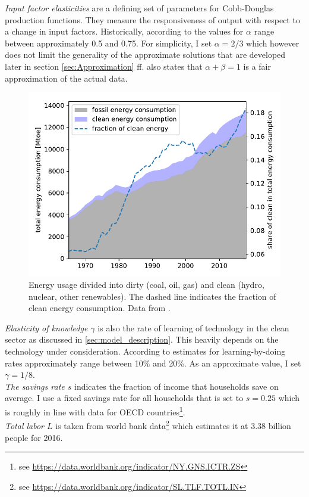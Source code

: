 \textit{Input factor elasticities} are a defining set of parameters for Cobb-Douglas production functions. They measure the responsiveness of output with respect to a change in input factors. Historically, according to \cite{Douglas1976} the values for $\alpha$ range between approximately 0.5 and 0.75. For simplicity, I set $\alpha=2/3$ which however does not limit the generality of the approximate solutions that are developed later in section \ref{sec:Approximation} ff. \cite{Douglas1976} also states that $\alpha+\beta=1$ is a fair approximation of the actual data.\\
\begin{figure}
	\vspace{-.4 cm}
        \hspace{-1.5 cm}
        \includegraphics[width = .65 \textwidth]{./figures/energy_consumption_clean_dirty.pdf}
        \caption{Energy usage divided into dirty (coal, oil, gas) and clean (hydro, nuclear, other renewables). The dashed line indicates the fraction of clean energy consumption. Data from \cite{dudley2019bp}.\label{fig:energy_data}}
\end{figure}
\textit{Elasticity of knowledge $\gamma$} is also the rate of learning of technology in the clean sector as discussed in \ref{sec:model_description}. This heavily depends on the technology under consideration. According to \cite{Kahouli-Brahmi2008} estimates for learning-by-doing rates approximately range between 10\% and 20\%. As an approximate value, I set $\gamma=1/8$. \\
\textit{The savings rate $s$} indicates the fraction of income that households save on average. I use a fixed savings rate for all households that is set to $s=0.25$ which is roughly in line with data for OECD countries\footnote{see \url{https://data.worldbank.org/indicator/NY.GNS.ICTR.ZS}}.\\
\textit{Total labor $L$} is taken from world bank data\footnote{see \url{https://data.worldbank.org/indicator/SL.TLF.TOTL.IN}} which estimates it at 3.38 billion people for 2016.\\
